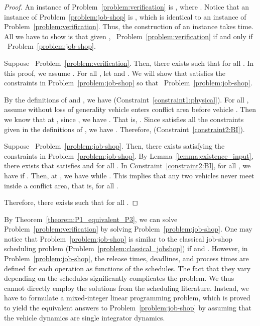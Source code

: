 \documentclass{sig-alternate}
\begin{document}
\begin{proof}
An instance of Problem~\ref{problem:verification} is , where  . 
Notice that an instance of Problem~\ref{problem:job-shop} is , which is identical to an instance of Problem~\ref{problem:verification}. Thus, the construction of an instance takes  time. All we have to show is that given , ~Problem~\ref{problem:verification} if and only if ~Problem~\ref{problem:job-shop}.

Suppose ~Problem~\ref{problem:verification}. Then, there exists  such that  for all . In this proof, we assume . For all , let  and . We will show that  satisfies the constraints in Problem~\ref{problem:job-shop} so that ~Problem~\ref{problem:job-shop}.

By the definitions of  and , we have  (Constraint~\eqref{constraint1:physical}). For all , assume without loss of generality vehicle  enters conflict area  before vehicle . Then we know that at , since , we have . That is, . Since  satisfies all the constraints given in the definitions of , we have . Therefore,  (Constraint~\eqref{constraint2:BI}). 


Suppose ~Problem~\ref{problem:job-shop}. Then, there exists  satisfying the constraints in Problem~\ref{problem:job-shop}. By Lemma~\ref{lemma:existence_input}, there exists  that satisfies  and  for all . In Constraint~\eqref{constraint2:BI}, for all , we have  if . Then, at , we have  while . This implies that any two vehicles never meet inside a conflict area, that is,  for all . 

Therefore, there exists  such that  for all .
\end{proof}

By Theorem~\ref{theorem:P1_equivalent_P3}, we can solve Problem~\ref{problem:verification} by solving Problem~\ref{problem:job-shop}. One may notice that Problem~\ref{problem:job-shop} is similar to the classical job-shop scheduling problem (Problem~\ref{problem:classical_jobshop}) if  and . However, in Problem~\ref{problem:job-shop}, the release times, deadlines, and process times are defined for each operation as functions of the schedules. The fact that they vary depending on the schedules significantly complicates the problem. We thus cannot directly employ the solutions from the scheduling literature. Instead, we have to formulate a mixed-integer linear programming problem, which is proved to yield the equivalent answers to Problem~\ref{problem:job-shop} by assuming that the vehicle dynamics are single integrator dynamics.
\end{document}
